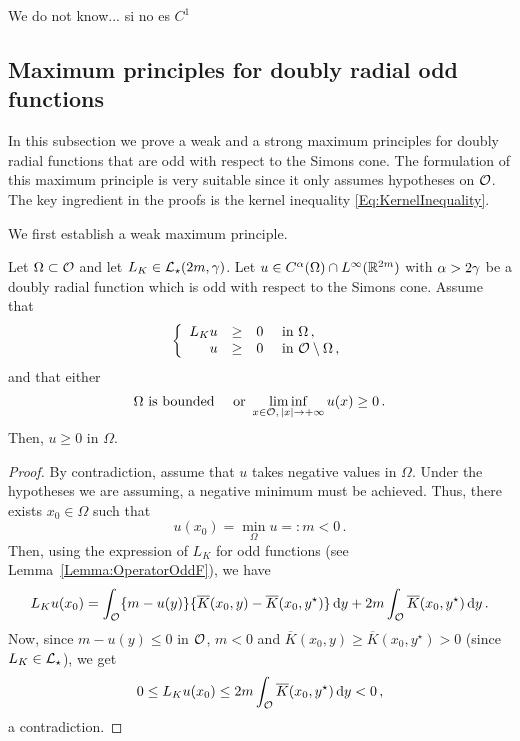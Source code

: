 \begin{remark}
	We do not know... si no es $C^1$ 
\end{remark}

\subsection{Maximum principles for doubly radial odd functions}

In this subsection we prove a weak and a strong maximum principles for doubly radial functions that are odd with respect to the Simons cone. The formulation of this maximum principle is very suitable since it only assumes hypotheses on $\mathcal{O}$. The key ingredient in the proofs is the kernel inequality \eqref{Eq:KernelInequality}.


We first establish a weak maximum principle.

\begin{proposition}
\label{Prop:WeakMaximumPrincipleForOddFunctions} Let $\Omega \subset \mathcal{O}$ and let $L_K  \in \mathcal{L}_\star (2m,  \gamma)$.  Let $u\in C^{\alpha}(\Omega)\cap L^\infty(\mathbb{R}^{2m})$ with $\alpha > 2\gamma$ be a doubly radial function which is odd with respect to the Simons cone. Assume that
$$
\left\{\begin{array}{rcll}
L_K u & \geq & 0 & \text{ in } \Omega\,,\\
u & \geq & 0 & \text{ in } \mathcal{O} \setminus \Omega\,,
\end{array} \right.
$$
and that either
$$
\Omega \text{ is bounded} \quad \text{ or } \liminf_{x \in \mathcal{O},\,|x|\to +\infty} u(x) \geq 0\,.
$$
Then, $u \geq 0$ in $\Omega$.
\end{proposition}

\begin{proof}
By contradiction, assume that $u$ takes negative values in $\Omega$. Under the hypotheses we are assuming, a negative minimum must be achieved. Thus, there exists $x_0\in \Omega$ such that
$$
u(x_0) = \min_{\Omega} u =: m < 0\,.
$$
Then, using the expression of $L_K$ for odd functions (see Lemma~\ref{Lemma:OperatorOddF}), we have
$$
L_K u (x_0) = \int_{\mathcal{O}} \{m - u(y) \} \{\overline{K}(x_0, y) - \overline{K}(x_0, y^\star)  \} \,\mathrm{d} y +  2 m \int_{\mathcal{O}} \overline{K}(x_0, y^\star) \,\mathrm{d} y\,.
$$
Now, since $m - u(y) \leq 0$ in $\mathcal{O}$, $m<0$ and $\overline{K}(x_0, y) \geq \overline{K}(x_0, y^\star)>0$ (since $L_K\in \mathcal{L}_\star$), we get
$$
0 \leq L_K  u(x_0) \leq 2m \int_{\mathcal{O}} \overline{K}(x_0, y^\star) \,\mathrm{d} y < 0\,,
$$
a contradiction.
\end{proof}

